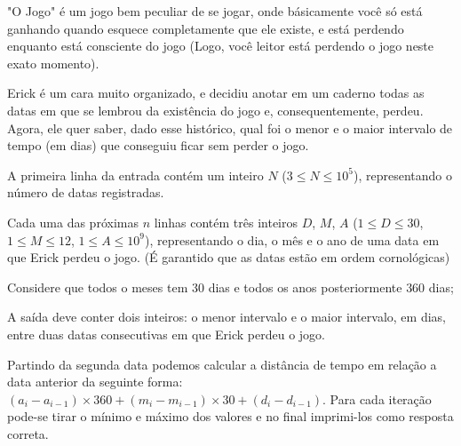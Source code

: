 "O Jogo" é um jogo bem peculiar de se jogar, onde básicamente você só está ganhando quando esquece completamente que ele existe, e está perdendo enquanto está consciente do jogo (Logo, você leitor está perdendo o jogo neste exato momento).  

Erick é um cara muito organizado, e decidiu anotar em um caderno todas as datas em que se lembrou da existência do jogo e, consequentemente, perdeu. Agora, ele quer saber, dado esse histórico, qual foi o menor e o maior intervalo de tempo (em dias) que conseguiu ficar sem perder o jogo.

A primeira linha da entrada contém um inteiro $N$ ($3 \leq N \leq 10^5$), representando o número de datas registradas.  

Cada uma das próximas $n$ linhas contém três inteiros $D$, $M$, $A$ ($1 \leq D \leq 30$, $1 \leq M \leq 12$, $1 \leq A \leq 10^9$), representando o dia, o mês e o ano de uma data em que Erick perdeu o jogo. (É garantido que as datas estão em ordem cornológicas)

Considere que todos o meses tem $30$ dias e todos os anos posteriormente $360$ dias;

A saída deve conter dois inteiros: o menor intervalo e o maior intervalo, em dias, entre duas datas consecutivas em que Erick perdeu o jogo.

Partindo da segunda data podemos calcular a distância de tempo em relação a data anterior da seguinte forma: $(a_i - a_{i-1}) \times 360 + (m_i - m_{i-1}) \times 30 + (d_i - d_{i-1})$.
Para cada iteração pode-se tirar o mínimo e máximo dos valores e no final imprimi-los como resposta correta.

